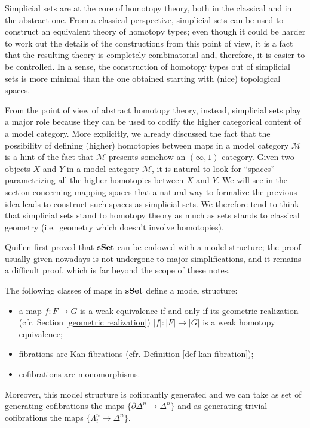 \begin{refsection}
Simplicial sets are at the core of homotopy theory, both in the classical and in the abstract one. From a classical perspective, simplicial sets can be used to construct an equivalent theory of homotopy types; even though it could be harder to work out the details of the constructions from this point of view, it is a fact that the resulting theory is completely combinatorial and, therefore, it is easier to be controlled. In a sense, the construction of homotopy types out of simplicial sets is more minimal than the one obtained starting with (nice) topological spaces.

From the point of view of abstract homotopy theory, instead, simplicial sets play a major role because they can be used to codify the higher categorical content of a model category. More explicitly, we already discussed the fact that the possibility of defining (higher) homotopies between maps in a model category $\mathcal M$ is a hint of the fact that $\mathcal M$ presents somehow an $(\infty,1)$-category. Given two objects $X$ and $Y$ in a model category $\mathcal M$, it is natural to look for ``spaces'' parametrizing all the higher homotopies between $X$ and $Y$. We will see in the section concerning mapping spaces that a natural way to formalize the previous idea leads to construct such spaces as simplicial sets. We therefore tend to think that simplicial sets stand to homotopy theory as much as sets stands to classical geometry (i.e.\ geometry which doesn't involve homotopies).

Quillen first proved that $\mathbf{s\,\!\mathbf{Set}}$ can be endowed with a model structure; the proof usually given nowadays is not undergone to major simplifications, and it remains a difficult proof, which is far beyond the scope of these notes.

\begin{thm} \label{thm model structure on sset}
The following classes of maps in $\mathbf{s\,\!\mathbf{Set}}$ define a model structure:
\begin{itemize}
\item a map $f \colon F \to G$ is a weak equivalence if and only if its geometric realization (cfr. Section \ref{geometric realization}) $|f| \colon |F| \to |G|$ is a weak homotopy equivalence;
\item fibrations are Kan fibrations (cfr. Definition \ref{def kan fibration});
\item cofibrations are monomorphisms.
\end{itemize}
Moreover, this model structure is cofibrantly generated and we can take as set of generating cofibrations the maps $\{\partial \Delta^n \to \Delta^n\}$ and as generating trivial cofibrations the maps $\{\Lambda^n_i \to \Delta^n\}$.
\end{thm}


\end{refsection}
